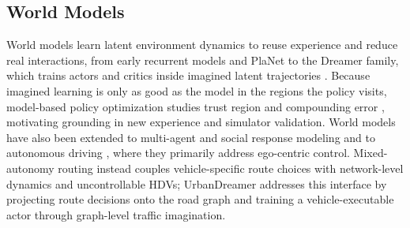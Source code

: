 \subsection{World Models}

World models learn latent environment dynamics to reuse experience and
reduce real interactions, from early recurrent models and PlaNet
\cite{ha2018recurrent,hafner2019learning} to the Dreamer family, which
trains actors and critics inside imagined latent trajectories
\cite{hafnerdream,hafnermastering,hafner2025mastering,dreamer4,zhan2026bootstrap}.
Because imagined learning is only as good as the model in the regions the
policy visits, model-based policy optimization studies trust region and
compounding error \cite{janner2019trust,rajeswaran2020game}, motivating
grounding in new experience and simulator validation.  World models have
also been extended to multi-agent and social response modeling
\cite{mamba,chai2024aligning,liu2024efficient,zhao2026learning,zhang2026social,shi2025gawm}
and to autonomous driving \cite{li2024think2drive,yang2026raw2drive}, where
they primarily address ego-centric control.  Mixed-autonomy routing instead
couples vehicle-specific route choices with network-level dynamics and
uncontrollable HDVs; UrbanDreamer addresses this interface by projecting
route decisions onto the road graph and training a vehicle-executable actor
through graph-level traffic imagination.
